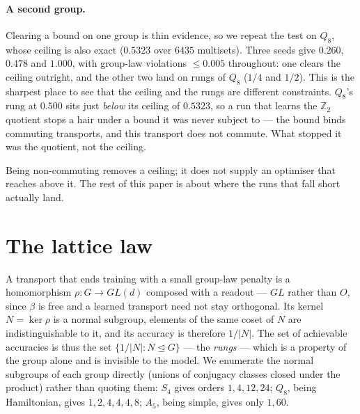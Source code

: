 \documentclass[10pt]{article}
\begin{document}
\paragraph{A second group.} Clearing a bound on one group is thin evidence, so we repeat the test on
$Q_8$, whose ceiling is also exact ($0.5323$ over $6435$ multisets). Three seeds give $0.260$,
$0.478$ and $1.000$, with group-law violations $\le0.005$ throughout: one clears the ceiling
outright, and the other two land on rungs of $Q_8$ ($1/4$ and $1/2$). This is the sharpest place to
see that the ceiling and the rungs are different constraints. $Q_8$'s rung at $0.500$ sits just
\emph{below} its ceiling of $0.5323$, so a run that learns the $\mathbb{Z}_2$ quotient stops a hair
under a bound it was never subject to --- the bound binds commuting transports, and this transport
does not commute. What stopped it was the quotient, not the ceiling.

Being non-commuting removes a ceiling; it does not supply an optimiser that reaches above it. The
rest of this paper is about where the runs that fall short actually land.

\section{The lattice law}
\label{sec:lattice}

A transport that ends training with a small group-law penalty is a homomorphism $\rho: G\to GL(d)$
composed with a readout --- $GL$ rather than $O$, since $\beta$ is free and a learned transport need
not stay orthogonal. Its kernel $N=\ker\rho$ is a normal subgroup, elements of the same coset of $N$
are indistinguishable to it, and its accuracy is therefore $1/|N|$. The set of achievable
accuracies is thus the set $\{1/|N| : N \trianglelefteq G\}$ --- the \emph{rungs} --- which is a
property of the group alone and is invisible to the model. We enumerate the normal subgroups of each
group directly (unions of conjugacy classes closed under the product) rather than quoting them:
$S_4$ gives orders $1,4,12,24$; $Q_8$, being Hamiltonian, gives $1,2,4,4,4,8$; $A_5$, being simple,
gives only $1,60$.
\end{document}
